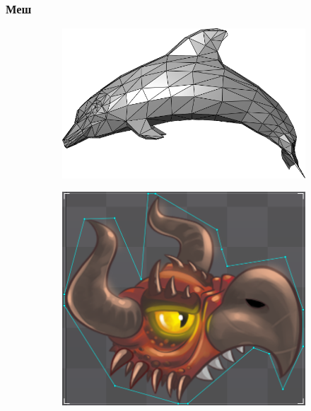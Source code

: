 \documentclass[10pt, unicode]{beamer}
\begin{document}
    \begin{frame}
        \frametitle{Меш}
        \begin{figure}[H]
            \centering
            \begin{subfigure}{0.49\linewidth}
                \centering
                \includegraphics[scale=0.25]{Dolphin_triangle_mesh.png}
            \end{subfigure}
            \begin{subfigure}{0.49\linewidth}
                \centering
                \includegraphics[scale=0.25]{2dmesh.png}
            \end{subfigure}
        \end{figure}
    \end{frame}
\end{document}
